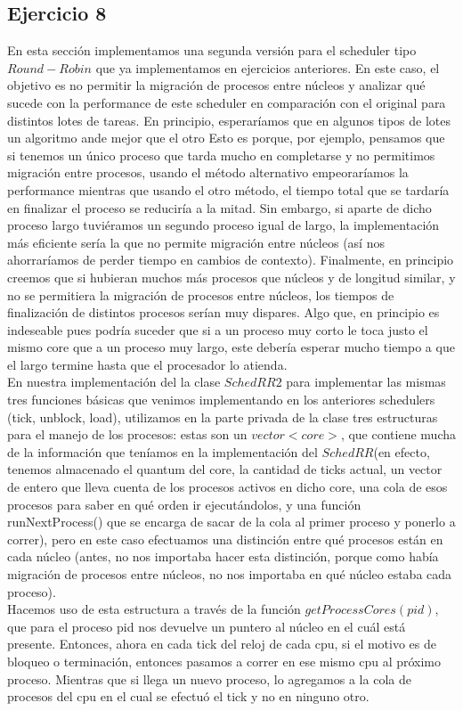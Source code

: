 \documentclass[a4paper]{article}
\begin{document}
\subsection{Ejercicio 8}
En esta secci\'on implementamos una segunda versi\'on para el scheduler tipo $Round-Robin$ que ya implementamos
en ejercicios anteriores. En este caso, el objetivo es no permitir la migraci\'on de procesos entre n\'ucleos y
analizar qu\'e sucede con la performance de este scheduler en comparaci\'on con el original para distintos lotes
de tareas. En principio, esperar\'iamos que en algunos tipos de lotes un algoritmo ande mejor que el otro
Esto es porque, por ejemplo, pensamos que si tenemos un 
\'unico proceso que tarda mucho en completarse y no permitimos migraci\'on entre procesos, usando el m\'etodo 
alternativo empeorar\'iamos la performance mientras que usando el otro m\'etodo, el tiempo total que se tardar\'ia
en finalizar el proceso se reducir\'ia a la mitad. Sin embargo, si aparte de dicho proceso largo tuvi\'eramos un
segundo proceso igual de largo, la implementaci\'on m\'as eficiente ser\'ia la que no permite migraci\'on entre 
n\'ucleos (as\'i nos ahorrar\'iamos de perder tiempo en cambios de contexto). Finalmente, en principio creemos que
si hubieran muchos m\'as procesos que n\'ucleos y de longitud similar, 
y no se permitiera la migraci\'on de procesos entre n\'ucleos, los tiempos de finalizaci\'on de distintos 
procesos ser\'ian muy dispares. Algo que, en principio es indeseable pues podr\'ia suceder que si a un proceso muy 
corto le toca justo el mismo core que a un proceso muy largo, este deber\'ia esperar mucho tiempo a que el largo
termine hasta que el procesador lo atienda. \\
En nuestra implementaci\'on del la clase $SchedRR2$ para implementar las mismas tres funciones b\'asicas que venimos
implementando en los anteriores schedulers (tick, unblock, load), utilizamos en la parte privada de la clase tres
estructuras para el manejo de los procesos: estas son un $vector<core>$, que contiene mucha de la informaci\'on 
que ten\'iamos en la implementaci\'on del $SchedRR$(en efecto, tenemos almacenado el quantum del core, la cantidad de
ticks actual, un vector de entero que lleva cuenta de los procesos activos en dicho core, una cola de esos procesos para
saber en qu\'e orden ir ejecut\'andolos, y una funci\'on runNextProcess() que se encarga de sacar de la cola al
primer proceso y ponerlo a correr), pero en este caso efectuamos una distinci\'on entre qu\'e procesos est\'an en cada
n\'ucleo (antes, no nos importaba hacer esta distinci\'on, porque como hab\'ia migraci\'on de procesos entre 
n\'ucleos, no nos importaba en qu\'e n\'ucleo estaba cada proceso). \\
Hacemos uso de esta estructura a trav\'es de la funci\'on $getProcessCores(pid)$, que para 
el proceso pid nos devuelve un puntero al n\'ucleo en el cu\'al est\'a presente. Entonces, ahora
en cada tick del reloj de cada cpu, si el motivo es de bloqueo o terminaci\'on, entonces pasamos a correr en ese mismo
cpu al pr\'oximo proceso. Mientras que si llega un nuevo proceso, lo agregamos a la cola de procesos del cpu
en el cual se efectu\'o el tick y no en ninguno otro. \\
\newpage
\end{document}
